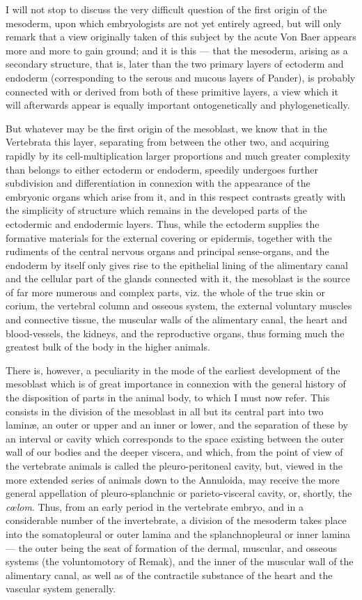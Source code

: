 \documentclass[a4paper, 11pt, oneside, english]{article}
\begin{document}
I will not stop to discuss the very difficult question of the first origin of the mesoderm, upon which embryologists are not yet entirely agreed, but will only remark that a view originally taken of this subject by the acute Von Baer appears more and more to gain ground; and it is this --- that the mesoderm, arising as a secondary structure, that is, later than the two primary layers of ectoderm and endoderm (corresponding to the serous and mucous layers of Pander), is probably connected with or derived from both of these primitive layers, a view which it will afterwards appear is equally important ontogenetically and phylogenetically.

But whatever may be the first origin of the mesoblast, we know that in the Vertebrata this layer, separating from between the other two, and acquiring rapidly by its cell-multiplication larger proportions and much greater complexity than belongs to either ectoderm or endoderm, speedily undergoes further subdivision and differentiation in connexion with the appearance of the embryonic organs which arise from it, and in this respect contrasts greatly with the simplicity of structure which remains in the developed parts of the ectodermic and endodermic layers. Thus, while the ectoderm supplies the formative materials for the external covering or epidermis, together with the rudiments of the central nervous organs and principal sense-organs, and the endoderm by itself only gives rise to the epithelial lining of the alimentary canal and the cellular part of the glands connected with it, the mesoblast is the source of far more numerous and complex parts, viz. the whole of the true skin or corium, the vertebral column and osseous system, the external voluntary muscles and connective tissue, the muscular walls of the alimentary canal, the heart and blood-vessels, the kidneys, and the reproductive organs, thus forming much the greatest bulk of the body in the higher animals.

There is, however, a peculiarity in the mode of the earliest development of the mesoblast which is of great importance in connexion with the general history of the disposition of parts in the animal body, to which I must now refer. This consists in the division of the mesoblast in all but its central part into two laminæ, an outer or upper and an inner or lower, and the separation of these by an interval or cavity which corresponds to the space existing between the outer wall of our bodies and the deeper viscera, and which, from the point of view of the vertebrate animals is called the pleuro-peritoneal cavity, but, viewed in the more extended series of animals down to the Annuloida, may receive the more general appellation of pleuro-splanchnic or parieto-visceral cavity, or, shortly, the \emph{cœlom}. Thus, from an early period in the vertebrate embryo, and in a considerable number of the invertebrate, a division of the mesoderm takes place into the somatopleural or outer lamina and the splanchnopleural or inner lamina --- the outer being the seat of formation of the dermal, muscular, and osseous systems (the voluntomotory of Remak), and the inner of the muscular wall of the alimentary canal, as well as of the contractile substance of the heart and the vascular system generally.
\end{document}

